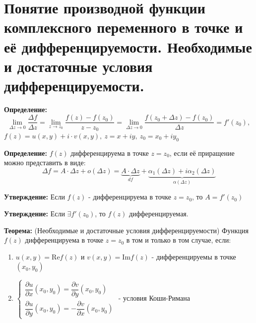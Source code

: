 \section{Понятие производной функции комплексного переменного в точке и
её дифференцируемости. Необходимые и достаточные условия
дифференцируемости.}\label{ux43fux43eux43dux44fux442ux438ux435-ux43fux440ux43eux438ux437ux432ux43eux434ux43dux43eux439-ux444ux443ux43dux43aux446ux438ux438-ux43aux43eux43cux43fux43bux435ux43aux441ux43dux43eux433ux43e-ux43fux435ux440ux435ux43cux435ux43dux43dux43eux433ux43e-ux432-ux442ux43eux447ux43aux435-ux438-ux435ux451-ux434ux438ux444ux444ux435ux440ux435ux43dux446ux438ux440ux443ux435ux43cux43eux441ux442ux438.-ux43dux435ux43eux431ux445ux43eux434ux438ux43cux44bux435-ux438-ux434ux43eux441ux442ux430ux442ux43eux447ux43dux44bux435-ux443ux441ux43bux43eux432ux438ux44f-ux434ux438ux444ux444ux435ux440ux435ux43dux446ux438ux440ux443ux435ux43cux43eux441ux442ux438.}

\textbf{Определение:} \[
\lim_{ \Delta z \to 0 } \frac{\Delta f}{\Delta z}=\lim_{ z \to z_{0} }  \frac{f(z)-f(z_{0})}{z-z_{0}}=\lim_{ \Delta z \to 0} \frac{f(z_{0}+\Delta z)-f(z_{0})}{\Delta z}=f'(z_{0}),
\] \(f(z)=u(x,y)+i\cdot v(x,y), \ z=x+iy, \ z_{0}=x_{0}+iy_{0}\)

\textbf{Определение:} \(f(z)\) дифференцируема в точке \(z=z_{0}\), если
её приращение можно представить в виде: \[
\Delta f=A\cdot\Delta z+o(\Delta z)=\underbrace{A\cdot\Delta z}_{df}+ \underbrace{\alpha_{1}(\Delta z)+i\alpha_{2}(\Delta z)}_{\alpha(\Delta z)}
\]

\textbf{Утверждение:} Если \(f(z)\) - дифференцируема в точке
\(z=z_{0}\), то \(A=f'(z_{0})\)

\textbf{Утверждение:} Если \(\exists f'(z_{0})\), то \(f(z)\)
дифференцируемая.

\textbf{Теорема:} (Необходимые и достаточные условия дифференцируемости)
Функция \(f(z)\) дифференцируема в точке \(z=z_{0}\) в том и только в
том случае, если:

\begin{enumerate}
\def\labelenumi{\arabic{enumi}.}
\tightlist
\item
  \(u(x,y)=\mathrm{Re} f(z)\) и \(v(x,y)=\mathrm{Im}f(z)\) -
  дифференцируемы в точке \((x_{0},y_{0})\)
\item
  \(\begin{cases} \dfrac{\partial u}{\partial x}(x_{0},y_{0})= \dfrac{\partial v}{\partial y}(x_{0},y_{0})  \\ \dfrac{\partial u}{\partial y}(x_{0},y_{0})=-\dfrac{\partial v}{\partial x}(x_{0},y_{0})\end{cases}\)
  - условия Коши-Римана
\end{enumerate}
